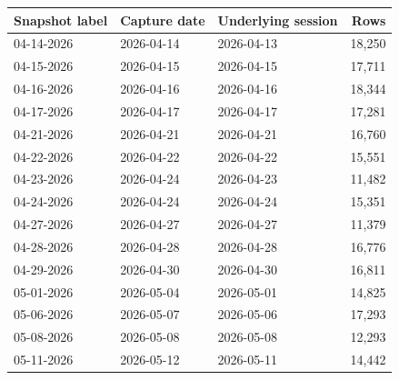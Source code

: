 \begin{tabular}{lllr}
\toprule
Snapshot label & Capture date & Underlying session & Rows \\
\midrule
04-14-2026 & 2026-04-14 & 2026-04-13 & 18,250 \\
04-15-2026 & 2026-04-15 & 2026-04-15 & 17,711 \\
04-16-2026 & 2026-04-16 & 2026-04-16 & 18,344 \\
04-17-2026 & 2026-04-17 & 2026-04-17 & 17,281 \\
04-21-2026 & 2026-04-21 & 2026-04-21 & 16,760 \\
04-22-2026 & 2026-04-22 & 2026-04-22 & 15,551 \\
04-23-2026 & 2026-04-24 & 2026-04-23 & 11,482 \\
04-24-2026 & 2026-04-24 & 2026-04-24 & 15,351 \\
04-27-2026 & 2026-04-27 & 2026-04-27 & 11,379 \\
04-28-2026 & 2026-04-28 & 2026-04-28 & 16,776 \\
04-29-2026 & 2026-04-30 & 2026-04-30 & 16,811 \\
05-01-2026 & 2026-05-04 & 2026-05-01 & 14,825 \\
05-06-2026 & 2026-05-07 & 2026-05-06 & 17,293 \\
05-08-2026 & 2026-05-08 & 2026-05-08 & 12,293 \\
05-11-2026 & 2026-05-12 & 2026-05-11 & 14,442 \\
\bottomrule
\end{tabular}
